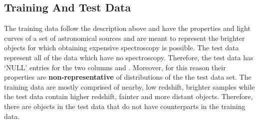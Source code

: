 \documentclass[\docopts]{\docclass}
\begin{document}
\subsection{Training And Test Data}
The training data follow the description above and have the properties and light curves of a set of {\numObjectsTraining} astronomical sources and are meant to represent the brighter objects for which obtaining expensive spectroscopy is possible. The test data represent all of the data which have no spectroscopy.
Therefore, the test data has `NULL' entries for the two columns {\specz} and {\class}. Moreover, for this reason their properties are \textbf{non-representative} of distributions of the
the test data set. The training data are mostly comprised of nearby, low redshift, brighter samples while the test data contain higher redshift, fainter and more distant objects. Therefore, there are objects in the test data that do not have counterparts in the training data.


\end{document}
